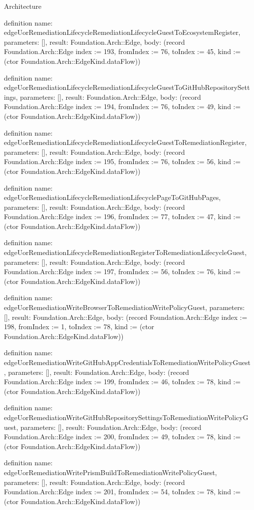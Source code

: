 \begin{lexlean}{Architecture}
\begin{semanticmodule}
definition{
  name: edgeUorRemediationLifecycleRemediationLifecycleGuestToEcosystemRegister,
  parameters: [],
  result: Foundation.Arch::Edge,
  body: (record Foundation.Arch::Edge {index := 193, fromIndex := 76, toIndex := 45, kind := (ctor Foundation.Arch::EdgeKind.dataFlow)})
}

definition{
  name: edgeUorRemediationLifecycleRemediationLifecycleGuestToGitHubRepositorySettings,
  parameters: [],
  result: Foundation.Arch::Edge,
  body: (record Foundation.Arch::Edge {index := 194, fromIndex := 76, toIndex := 49, kind := (ctor Foundation.Arch::EdgeKind.dataFlow)})
}

definition{
  name: edgeUorRemediationLifecycleRemediationLifecycleGuestToRemediationRegister,
  parameters: [],
  result: Foundation.Arch::Edge,
  body: (record Foundation.Arch::Edge {index := 195, fromIndex := 76, toIndex := 56, kind := (ctor Foundation.Arch::EdgeKind.dataFlow)})
}

definition{
  name: edgeUorRemediationLifecycleRemediationLifecyclePageToGitHubPages,
  parameters: [],
  result: Foundation.Arch::Edge,
  body: (record Foundation.Arch::Edge {index := 196, fromIndex := 77, toIndex := 47, kind := (ctor Foundation.Arch::EdgeKind.dataFlow)})
}

definition{
  name: edgeUorRemediationLifecycleRemediationRegisterToRemediationLifecycleGuest,
  parameters: [],
  result: Foundation.Arch::Edge,
  body: (record Foundation.Arch::Edge {index := 197, fromIndex := 56, toIndex := 76, kind := (ctor Foundation.Arch::EdgeKind.dataFlow)})
}

definition{
  name: edgeUorRemediationWriteBrowserToRemediationWritePolicyGuest,
  parameters: [],
  result: Foundation.Arch::Edge,
  body: (record Foundation.Arch::Edge {index := 198, fromIndex := 1, toIndex := 78, kind := (ctor Foundation.Arch::EdgeKind.dataFlow)})
}

definition{
  name: edgeUorRemediationWriteGitHubAppCredentialsToRemediationWritePolicyGuest,
  parameters: [],
  result: Foundation.Arch::Edge,
  body: (record Foundation.Arch::Edge {index := 199, fromIndex := 46, toIndex := 78, kind := (ctor Foundation.Arch::EdgeKind.dataFlow)})
}

definition{
  name: edgeUorRemediationWriteGitHubRepositorySettingsToRemediationWritePolicyGuest,
  parameters: [],
  result: Foundation.Arch::Edge,
  body: (record Foundation.Arch::Edge {index := 200, fromIndex := 49, toIndex := 78, kind := (ctor Foundation.Arch::EdgeKind.dataFlow)})
}

definition{
  name: edgeUorRemediationWritePrismBuildToRemediationWritePolicyGuest,
  parameters: [],
  result: Foundation.Arch::Edge,
  body: (record Foundation.Arch::Edge {index := 201, fromIndex := 54, toIndex := 78, kind := (ctor Foundation.Arch::EdgeKind.dataFlow)})
}


\end{semanticmodule}
\end{lexlean}

